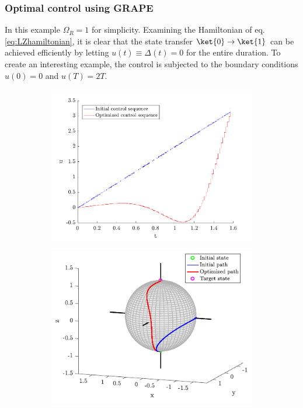 \subsubsection{Optimal control using GRAPE} 
In this example $\Omega_R = 1$ for simplicity. Examining the Hamiltonian of eq. \eqref{eq:LZhamiltonian}, it is clear that the state transfer $\ket{0} \to \ket{1}$ can be achieved efficiently by letting $u(t) \equiv \Delta (t) = 0$ for the entire duration. To create an interesting example, the control is subjected to the boundary conditions $u(0) = 0$ and $u(T) = 2 T$.
\renewcommand{\thesubfigure}{\alph{subfigure}}
\begin{figure}[h!]
\centering %
\begin{subfigure}[b]{0.48\textwidth}
	\caption{}  
  	\includegraphics[width=\textwidth]{Figures/LZcontrol1.pdf}
\end{subfigure}
\hspace{3mm}
\begin{subfigure}[b]{0.48\textwidth}
	\caption{}    
  	\includegraphics[width=\textwidth]{Figures/LZpath1.pdf}
\end{subfigure}


\end{figure}
